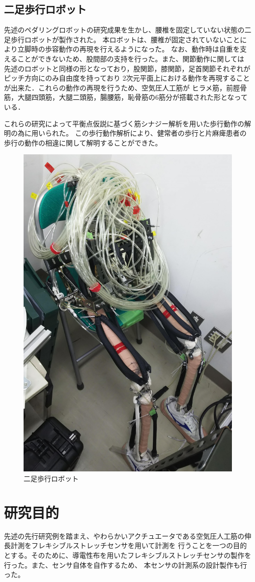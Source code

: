 \newpage

\subsection{二足歩行ロボット}
先述のペダリングロボットの研究成果を生かし、腰椎を固定していない状態の二足歩行ロボットが製作された。
本ロボットは、腰椎が固定されていないことにより立脚時の歩容動作の再現を行えるようになった。
なお、動作時は自重を支えることができないため、股間部の支持を行った。また、関節動作に関しては
先述のロボットと同様の形となっており，股関節，膝関節，足首関節それぞれがピッチ方向にのみ自由度を持っており
2次元平面上における動作を再現することが出来た．これらの動作の再現を行うため、空気圧人工筋が
ヒラメ筋，前脛骨筋，大腿四頭筋，大腿二頭筋，腸腰筋，恥骨筋の6筋分が搭載された形となっている．

これらの研究によって平衡点仮説に基づく筋シナジー解析を用いた歩行動作の解明の為に用いられた。
この歩行動作解析により、健常者の歩行と片麻痺患者の歩行の動作の相違に関して解明することができた。
\begin{figure}[h]
  \begin{center}
  \includegraphics[width=0.35\columnwidth,clip]{./1_prolusion/2nd.eps}
  \caption{二足歩行ロボット}
  \label{2号機}
 \end{center}
\end{figure}

\newpage

\section{研究目的}
先述の先行研究例を踏まえ、やわらかいアクチュエータである空気圧人工筋の伸長計測をフレキシブルストレッチセンサを用いて計測を
行うことを一つの目的とする。そのために、導電性布を用いたフレキシブルストレッチセンサの製作を行った。また、センサ自体を自作するため、
本センサの計測系の設計製作も行った。

